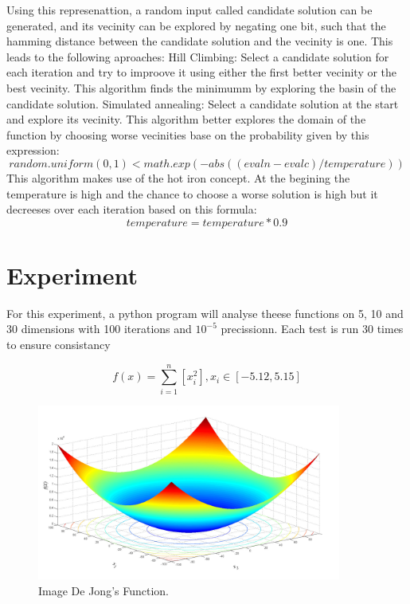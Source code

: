 \documentclass{report}
\begin{document}
Using this represenattion, a random input called candidate solution can be generated, and its vecinity can be explored by negating one bit, such that the hamming distance between the candidate solution and the vecinity is one. This leads to the following aproaches:
\newline
\newline
Hill Climbing:
\newline
\newline
Select a candidate solution for each iteration and try to improove it using either the first better vecinity or the best vecinity. This algorithm finds the minimumm by exploring the basin of the candidate solution.
\newline
\newline
Simulated annealing:
\newline
\newline
Select a candidate solution at the start and explore its vecinity. This algorithm better explores the domain of the function by choosing worse vecinities base on the probability given by this expression:
\newline
$$random.uniform(0, 1) < math.exp(-abs((evaln - evalc) / temperature))$$
\newline
This algorithm makes use of the hot iron concept. At the begining the temperature  is high and the chance to choose a worse solution is high but it decreeses over each iteration based on this formula:
\newline
$$temperature = temperature * 0.9$$


\section{Experiment}

For this experiment, a python program will analyse theese functions on 5, 10 and 30 dimensions with 100 iterations and $10^{-5}$ precissionn. Each test is run 30 times to ensure consistancy

\begin{figure}[!h]
  \centering
  $$ f(x) = \sum_{i=1}^n \left[ x_i^2 \right],
   x_i \in \left[ -5.12, 5.15 \right]$$

  \includegraphics[width=100mm,scale=0.5]{De_Jong_function}
  \caption{Image De Jong's Function.\protect\footnotemark}
\end{figure}
\end{document}
